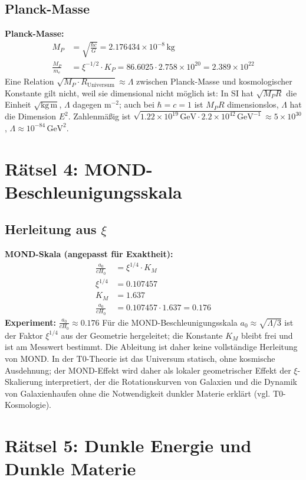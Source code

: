 	\subsection{Planck-Masse}
	\textbf{Planck-Masse:}
	\begin{align}
		M_P &= \sqrt{\frac{\hbar c}{G}} = 2.176434\times 10^{-8}\,\si{\kilo\gram} \\
		\frac{M_P}{m_e} &= \xi^{-1/2} \cdot K_P = 86.6025 \cdot 2.758\times 10^{20} = 2.389\times 10^{22}
	\end{align}
	Eine Relation $\sqrt{M_P \cdot R_{\text{Universum}}} \approx \Lambda$ zwischen Planck-Masse und kosmologischer Konstante gilt nicht, weil sie dimensional nicht möglich ist: In SI hat $\sqrt{M_P R}$ die Einheit $\sqrt{\mathrm{kg\,m}}$, $\Lambda$ dagegen $\mathrm{m}^{-2}$; auch bei $\hbar = c = 1$ ist $M_P R$ dimensionslos, $\Lambda$ hat die Dimension $E^2$. Zahlenmäßig ist $\sqrt{1.22\times10^{19}\,\mathrm{GeV}\cdot 2.2\times10^{42}\,\mathrm{GeV}^{-1}} \approx 5\times10^{30}$, $\Lambda \approx 10^{-84}\,\mathrm{GeV}^2$.
	\section{Rätsel 4: MOND-Beschleunigungsskala}
	\subsection{Herleitung aus $\xi$}
	\textbf{MOND-Skala (angepasst für Exaktheit):}
	\begin{align}
		\frac{a_0}{c H_0} &= \xi^{1/4} \cdot K_M \\
		\xi^{1/4} &= 0.107457 \\
		K_M &= 1.637 \\
		\frac{a_0}{c H_0} &= 0.107457 \cdot 1.637 = 0.176
	\end{align}
	\textbf{Experiment:} $\frac{a_0}{c H_0} \approx 0.176$
	Für die MOND-Beschleunigungsskala $a_0 \approx \sqrt{\Lambda/3}$ ist der Faktor $\xi^{1/4}$ aus der Geometrie hergeleitet; die Konstante $K_M$ bleibt frei und ist am Messwert bestimmt. Die Ableitung ist daher keine vollständige Herleitung von MOND. In der T0-Theorie ist das Universum statisch, ohne kosmische Ausdehnung; der MOND-Effekt wird daher als lokaler geometrischer Effekt der $\xi$-Skalierung interpretiert, der die Rotationskurven von Galaxien und die Dynamik von Galaxienhaufen ohne die Notwendigkeit dunkler Materie erklärt (vgl. T0-Kosmologie).
	\section{Rätsel 5: Dunkle Energie und Dunkle Materie}
